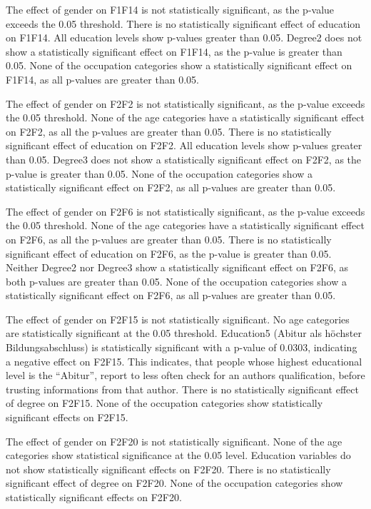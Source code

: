 \documentclass[
  12pt,
  a4paper,
  twoside]{article}
\begin{document}
The effect of gender on F1F14 is not statistically significant, as the p-value exceeds the 0.05 threshold.
There is no statistically significant effect of education on F1F14. All education levels show p-values greater than 0.05.
Degree2 does not show a statistically significant effect on F1F14, as the p-value is greater than 0.05.
None of the occupation categories show a statistically significant effect on F1F14, as all p-values are greater than 0.05.

The effect of gender on F2F2 is not statistically significant, as the p-value exceeds the 0.05 threshold.
None of the age categories have a statistically significant effect on F2F2, as all the p-values are greater than 0.05.
There is no statistically significant effect of education on F2F2. All education levels show p-values greater than 0.05.
Degree3 does not show a statistically significant effect on F2F2, as the p-value is greater than 0.05.
None of the occupation categories show a statistically significant effect on F2F2, as all p-values are greater than 0.05.

The effect of gender on F2F6 is not statistically significant, as the p-value exceeds the 0.05 threshold.
None of the age categories have a statistically significant effect on F2F6, as all the p-values are greater than 0.05.
There is no statistically significant effect of education on F2F6, as the p-value is greater than 0.05.
Neither Degree2 nor Degree3 show a statistically significant effect on F2F6, as both p-values are greater than 0.05.
None of the occupation categories show a statistically significant effect on F2F6, as all p-values are greater than 0.05.

The effect of gender on F2F15 is not statistically significant.
No age categories are statistically significant at the 0.05 threshold.
Education5 (Abitur als höchster Bildungsabschluss) is statistically significant with a p-value of 0.0303, indicating a negative effect on F2F15.
This indicates, that people whose highest educational level is the ``Abitur'', report to less often check for an authors qualification, before trusting informations from that author.
There is no statistically significant effect of degree on F2F15.
None of the occupation categories show statistically significant effects on F2F15.

The effect of gender on F2F20 is not statistically significant.
None of the age categories show statistical significance at the 0.05 level.
Education variables do not show statistically significant effects on F2F20.
There is no statistically significant effect of degree on F2F20.
None of the occupation categories show statistically significant effects on F2F20.
\end{document}
